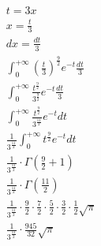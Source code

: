 \begin{gather*}
  t = 3x \\
  x = \frac{t}{3} \\
  dx = \frac{dt}{3} \\
  \int_{0}^{+\infty} \left(\frac{t}{3}\right)^{\frac{9}{2}}e^{-t} \frac{dt}{3} \\
  \int_{0}^{+\infty} \frac{t^{\frac{9}{2}}}{3^{\frac{9}{2}}}e^{-t} \frac{dt}{3} \\
  \int_{0}^{+\infty} \frac{t^{\frac{9}{2}}}{3^{\frac{11}{2}}}e^{-t} dt \\
  \frac{1}{3^{\frac{11}{2}}} \int_{0}^{+\infty} t^{\frac{9}{2}}e^{-t} dt \\
  \frac{1}{3^{\frac{11}{2}}} \cdot \Gamma\left(\frac{9}{2} + 1\right) \\
  \frac{1}{3^{\frac{11}{2}}} \cdot \Gamma\left(\frac{11}{2}\right) \\
  \frac{1}{3^{\frac{11}{2}}} \cdot \frac{9}{2} \cdot \frac{7}{2} \cdot \frac{5}{2} \cdot \frac{3}{2} \cdot \frac{1}{2} \sqrt{\pi} \\
  \frac{1}{3^{\frac{11}{2}}} \cdot \frac{945}{32} \sqrt{\pi} \\
\end{gather*}